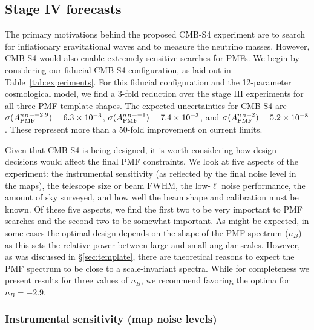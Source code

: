 \documentclass[apj]{emulateapj}
\newcommand{\apmf}{\ensuremath{A_{\rm PMF}}}
\newcommand{\changed}[1]{\textcolor{Black}{#1}}
\begin{document}
\subsection{Stage IV forecasts}

The primary motivations behind the proposed CMB-S4 experiment are to search for inflationary gravitational waves and to measure the neutrino masses.
However, CMB-S4 would also enable extremely sensitive searches for PMFs. 
We begin by considering our fiducial CMB-S4 configuration, as laid out in Table~\ref{tab:experiments}. 
For this fiducial configuration and the \changed{12}-parameter cosmological model, we find a 3-fold reduction over the stage III experiments for all three PMF template shapes. 
The expected uncertainties for CMB-S4 are $\sigma(\apmf^{n_B=-2.9}) =   \fisherAlooseSFour$, $\sigma(\apmf^{n_B=-1}) =   \fisherAlooseNbOneSFour$, and $\sigma(\apmf^{n_B=2}) =   \fisherAlooseNbTwoSFour$. 
These represent more than a 50-fold improvement on current limits. 


Given that CMB-S4 is being designed, it is worth considering how design decisions would affect the final PMF constraints. 
We look at five aspects of the experiment: the instrumental sensitivity (as reflected by the final noise level in the maps), the telescope size or beam FWHM,  the low-$\ell$ noise performance, the amount of sky surveyed,  and how well the beam shape and calibration must be known. 
Of these five aspects, we find the first two to be very important to PMF searches and the second two to be somewhat important. 
As might be expected, in some cases the optimal design depends on the shape of the PMF spectrum ($n_B$) as this sets  the relative power between large and small angular scales.  
However, as was discussed in \S\ref{sec:template},  there are theoretical reasons to expect the PMF spectrum to be close to a scale-invariant spectra. 
While for completeness we present results for three values of $n_B$, we recommend favoring the optima for $n_B=-2.9$. 

\subsubsection{Instrumental sensitivity (map noise levels)}
\end{document}
